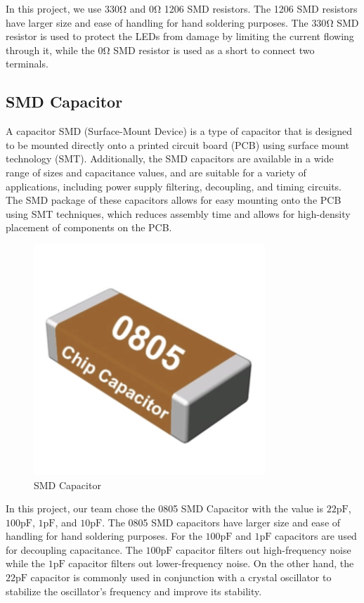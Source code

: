 \documentclass[a4paper, twoside]{report}
\begin{document}
In this project, we use $330 \si{\ohm}$ and $0 \si\ohm$ 1206 SMD resistors. The 1206 SMD resistors have larger size and ease of handling for hand soldering purposes. The $330 \si\ohm$ SMD resistor is used to protect the LEDs from damage by limiting the current flowing through it, while the $0 \si\ohm$ SMD resistor is used as a short to connect two terminals.

\subsection{SMD Capacitor}
A capacitor SMD (Surface-Mount Device) is a type of capacitor that is designed to be mounted directly onto a printed circuit board (PCB) using surface mount technology (SMT). Additionally, the SMD capacitors are available in a wide range of sizes and capacitance values, and are suitable for a variety of applications, including power supply filtering, decoupling, and timing circuits.  The SMD package of these capacitors allows for easy mounting onto the PCB using SMT techniques, which reduces assembly time and allows for high-density placement of components on the PCB.
\begin{figure}[H]
    \begin{center}
    \includegraphics[trim=0cm 1cm 0cm 1cm,clip,width=.25\textwidth]{images/capacitor.png}
    \caption{SMD Capacitor}
    \end{center} 
\end{figure}

In this project, our team chose the 0805 SMD Capacitor with the value is $22 \si{\pico\farad}$, $100 \si{\pico\farad}$, $1 \si{\pico\farad}$, and $10 \si{\pico\farad}$. The 0805 SMD capacitors have larger size and ease of handling for hand soldering purposes. For the $100 \si{\pico\farad}$ and $1 \si{\pico\farad}$ capacitors are used for decoupling capacitance. The $100 \si{\pico\farad}$ capacitor filters out high-frequency noise while the $1 \si{\pico\farad}$ capacitor filters out lower-frequency noise. On the other hand, the $22 \si{\pico\farad}$ capacitor is commonly used in conjunction with a crystal oscillator to stabilize the oscillator's frequency and improve its stability. 
\end{document}
